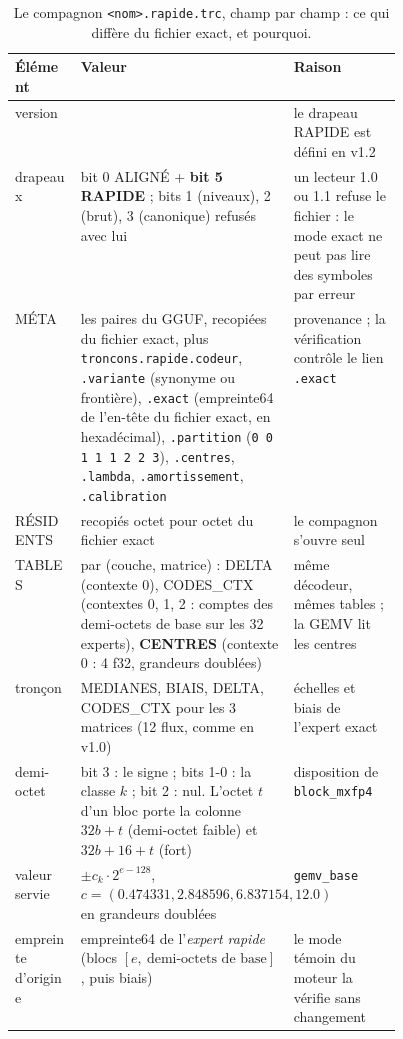 \begin{table}[ht]
\centering\footnotesize
\caption[Le compagnon rapide, champ par champ]{Le compagnon \texttt{<nom>.rapide.trc}, champ par champ : ce qui diffère du fichier exact, et pourquoi.}
\label{t3sno:tab:format}
\begin{tabularx}{\linewidth}{@{}>{\raggedright\arraybackslash}p{0.17\linewidth}>{\raggedright\arraybackslash}X>{\raggedright\arraybackslash}p{0.28\linewidth}@{}}
\toprule
Élément & Valeur & Raison \\
\midrule
version & 1.2 & le drapeau RAPIDE est défini en v1.2 \\
drapeaux & bit 0 ALIGNÉ + \textbf{bit 5 RAPIDE} ; bits 1 (niveaux), 2 (brut), 3 (canonique) refusés avec lui & un lecteur 1.0 ou 1.1 refuse le fichier : le mode exact ne peut pas lire des symboles par erreur \\
MÉTA & les paires du GGUF, recopiées du fichier exact, plus \texttt{troncons.rapide.codeur}, \texttt{.variante} (synonyme ou frontière), \texttt{.exact} (empreinte64 de l'en-tête du fichier exact, en hexadécimal), \texttt{.partition} (\texttt{0 0 1 1 1 2 2 3}), \texttt{.centres}, \texttt{.lambda}, \texttt{.amortissement}, \texttt{.calibration} & provenance ; la vérification contrôle le lien \texttt{.exact} \\
RÉSIDENTS & recopiés octet pour octet du fichier exact & le compagnon s'ouvre seul \\
TABLES & par (couche, matrice) : DELTA (contexte 0), CODES\_CTX (contextes 0, 1, 2 : comptes des demi-octets de base sur les 32 experts), \textbf{CENTRES} (contexte 0 : 4 f32, grandeurs doublées) & même décodeur, mêmes tables ; la GEMV lit les centres \\
tronçon & MEDIANES, BIAIS, DELTA, CODES\_CTX pour les 3 matrices (12 flux, comme en v1.0) & échelles et biais de l'expert exact \\
demi-octet & bit 3 : le signe ; bits 1-0 : la classe $k$ ; bit 2 : nul. L'octet $t$ d'un bloc porte la colonne $32b + t$ (demi-octet faible) et $32b + 16 + t$ (fort) & disposition de \texttt{block\_mxfp4} \\
valeur servie & $\pm c_k \cdot 2^{e - 128}$, $c = (\num{0.474331}, \num{2.848596}, \num{6.837154}, \num{12.0})$ en grandeurs doublées & \texttt{gemv\_base} \\
empreinte d'origine & empreinte64 de l'\emph{expert rapide} (blocs $[e,\ \text{demi-octets de base}]$, puis biais) & le mode témoin du moteur la vérifie sans changement \\
\bottomrule
\end{tabularx}
\end{table}

